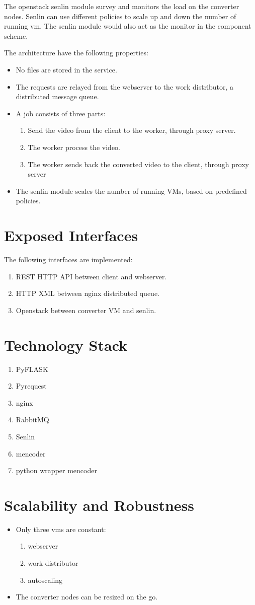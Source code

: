 \documentclass[]{article}
\begin{document}
The openstack senlin module survey and monitors the load on the
converter nodes. Senlin can use different policies to scale up and
down the number of running vm. The senlin module would also act as the
monitor in the component scheme.

The architecture have the following properties:
\begin{itemize}
\item No files are stored in the service.
\item The requests are relayed from the webserver to the work distributor, a distributed message queue.
\item A job consists of three parts:
  \begin{enumerate}
  \item Send the video from the client to the worker, through proxy server.
  \item The worker process the video.
  \item The worker sends back the converted video to the client, through proxy server
  \end{enumerate}
\item The senlin module scales the number of running VMs, based on predefined policies.
\end{itemize}

\section*{Exposed Interfaces}

The following interfaces are implemented:

\begin{enumerate}
\item REST HTTP API between client and webserver.
\item HTTP XML between nginx distributed queue.
\item Openstack between converter VM and senlin.
\end{enumerate}

\section*{Technology Stack}
\begin{enumerate}
\item PyFLASK
\item Pyrequest
\item nginx
\item RabbitMQ
\item Senlin
\item mencoder
\item python wrapper mencoder
\end{enumerate}

\section*{Scalability and Robustness}

\begin{itemize}
\item Only three vms are constant:
  \begin{enumerate}
  \item webserver
  \item work distributor
  \item autoscaling
  \end{enumerate}
\item The converter nodes can be resized on the go.
\end{itemize}
\end{document}
